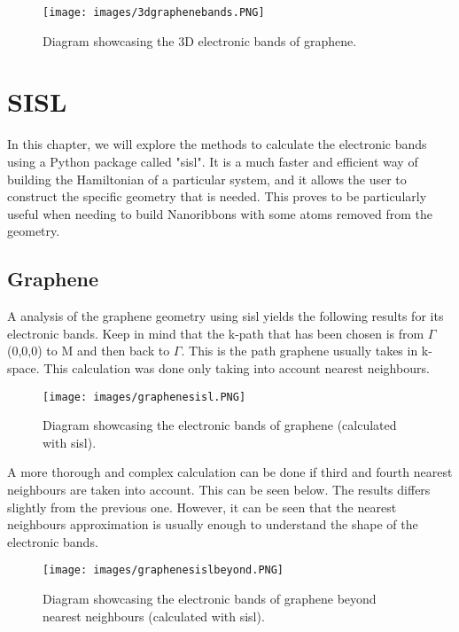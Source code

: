 \documentclass[a4paper,12pt]{report}
\begin{document}
\begin{figure}[h]
	\begin{center}
		\texttt{[image: images/3dgraphenebands.PNG]}
	\end{center}
	\caption{Diagram showcasing the 3D electronic bands of graphene.} 
	\label{fig:graphene2d}
\end{figure}


\chapter{SISL}

In this chapter, we will explore the methods to calculate the electronic bands using a Python package called "sisl". It is a much faster and efficient way of building the Hamiltonian of a particular system, and it allows the user to construct the specific geometry that is needed. This proves to be particularly useful when needing to build Nanoribbons with some atoms removed from the geometry. 

\section{Graphene}

A analysis of the graphene geometry using sisl yields the following results for its electronic bands. Keep in mind that the k-path that has been chosen is from $\Gamma$ (0,0,0) to M and then back to $\Gamma$. This is the path graphene usually takes in k-space. This calculation was done only taking into account nearest neighbours.


\begin{figure}[h]
	\begin{center}
		\texttt{[image: images/graphenesisl.PNG]}
	\end{center}
	\caption{Diagram showcasing the electronic bands of graphene (calculated with sisl).} 
	\label{fig:graphenesisl}
\end{figure}


A more thorough and complex calculation can be done if third and fourth nearest neighbours are taken into account. This can be seen below. The results differs slightly from the previous one. However, it can be seen that the nearest neighbours approximation is usually enough to understand the shape of the electronic bands.

\begin{figure}[h]
	\begin{center}
		\texttt{[image: images/graphenesislbeyond.PNG]}
	\end{center}
	\caption{Diagram showcasing the electronic bands of graphene beyond nearest neighbours (calculated with sisl).} 
	\label{fig:graphenesislbeyond}
\end{figure}
\end{document}
